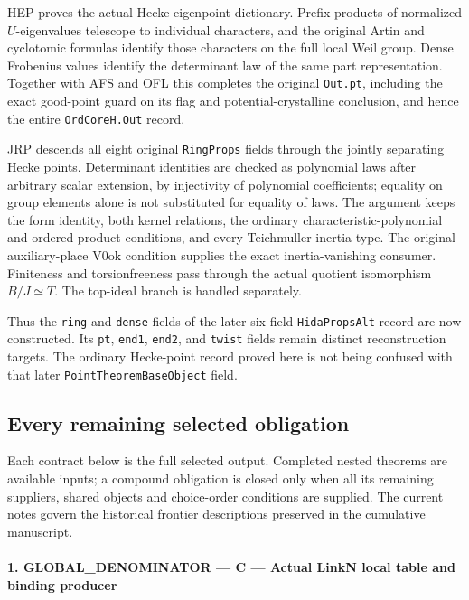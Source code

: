 \documentclass[11pt,a4paper]{article}
\numberwithin{equation}{section}
\theoremstyle{remark}\newtheorem{remark}[theorem]{Remark}
\begin{document}
HEP proves the actual Hecke-eigenpoint dictionary.  Prefix products
of normalized $U$-eigenvalues telescope to individual characters,
and the original Artin and cyclotomic formulas identify those
characters on the full local Weil group.  Dense Frobenius values
identify the determinant law of the same part representation.
Together with AFS and OFL this completes the original
\texttt{Out.\allowbreak pt}, including the exact good-point guard on its
flag and potential-crystalline conclusion, and hence the entire
\texttt{Ord\allowbreak Core\allowbreak H.\allowbreak Out} record.

JRP descends all eight original \texttt{Ring\allowbreak Props} fields through
the jointly separating Hecke points.  Determinant identities are
checked as polynomial laws after arbitrary scalar extension, by
injectivity of polynomial coefficients; equality on group elements
alone is not substituted for equality of laws.  The argument keeps
the form identity, both kernel relations, the ordinary
characteristic-polynomial and ordered-product conditions, and every
Teichmuller inertia type.  The original auxiliary-place
$\mathrm{V0ok}$ condition supplies the exact inertia-vanishing
consumer.  Finiteness and torsionfreeness pass through the actual
quotient isomorphism $B/J\simeq T$.  The top-ideal branch is
handled separately.

Thus the \texttt{ring} and \texttt{dense} fields of the later
six-field \texttt{Hida\allowbreak Props\allowbreak Alt} record are now constructed.
Its \texttt{pt}, \texttt{end1}, \texttt{end2}, and
\texttt{twist} fields remain distinct reconstruction targets.
The ordinary Hecke-point record proved here is not being confused
with that later \texttt{Point\allowbreak Theorem\allowbreak Base\allowbreak Object} field.

\subsection{Every remaining selected obligation}

Each contract below is the full selected output.  Completed nested
theorems are available inputs; a compound obligation is closed only
when all its remaining suppliers, shared objects and choice-order
conditions are supplied.  The current notes govern the historical
frontier descriptions preserved in the cumulative manuscript.
\paragraph{1. GLOBAL\_\allowbreak DENOMINATOR — C — Actual LinkN local table and binding producer}
\end{document}
